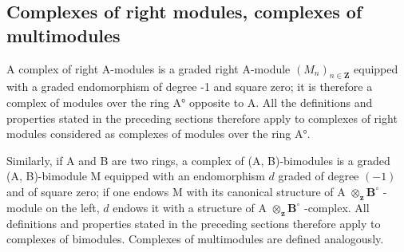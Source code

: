 \subsection{Complexes of right modules, complexes of multimodules}

A complex of right A-modules is a graded right A-module \((M_{n})_{n\in\mathbf{Z}}\) equipped with a graded endomorphism of degree -1 and square zero; it is therefore a complex of modules over the ring A° opposite to A. All the definitions and properties stated in the preceding sections therefore apply to complexes of right modules considered as complexes of modules over the ring A°.

Similarly, if A and B are two rings, a complex of (A, B)-bimodules is a graded (A, B)-bimodule M equipped with an endomorphism \(d\) graded of degree \((-1)\) and of square zero; if one endows M with its canonical structure of A \(\otimes_{\mathbf{z}} \mathbf{B}^{\circ}\) -module on the left, \(d\) endows it with a structure of A \(\otimes_{\mathbf{z}} \mathbf{B}^{\circ}\) -complex. All definitions and properties stated in the preceding sections therefore apply to complexes of bimodules. Complexes of multimodules are defined analogously.

